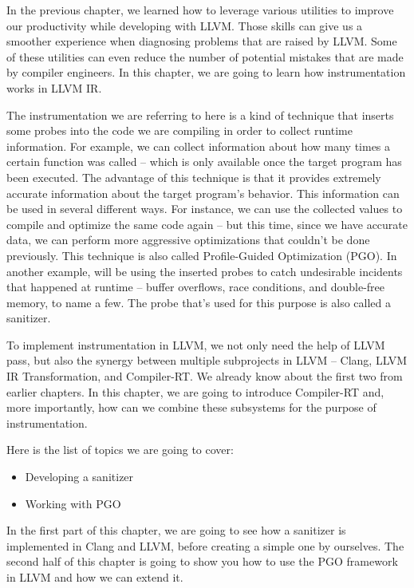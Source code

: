 In the previous chapter, we learned how to leverage various utilities to improve our productivity while developing with LLVM. Those skills can give us a smoother experience when diagnosing problems that are raised by LLVM. Some of these utilities can even reduce the number of potential mistakes that are made by compiler engineers. In this chapter, we are going to learn how instrumentation works in LLVM IR.

The instrumentation we are referring to here is a kind of technique that inserts some probes into the code we are compiling in order to collect runtime information. For example, we can collect information about how many times a certain function was called – which is only available once the target program has been executed. The advantage of this technique is that it provides extremely accurate information about the target program's behavior. This information can be used in several different ways. For instance, we can use the collected values to compile and optimize the same code again – but this time, since we have accurate data, we can perform more aggressive optimizations that couldn't be done previously. This technique is also called Profile-Guided Optimization (PGO). In another example, will be using the inserted probes to catch undesirable incidents that happened at runtime – buffer overflows, race conditions, and double-free memory, to name a few. The probe that's used for this purpose is also called a sanitizer.

To implement instrumentation in LLVM, we not only need the help of LLVM pass, but also the synergy between multiple subprojects in LLVM – Clang, LLVM IR Transformation, and Compiler-RT. We already know about the first two from earlier chapters. In this chapter, we are going to introduce Compiler-RT and, more importantly, how can we combine these subsystems for the purpose of instrumentation.

Here is the list of topics we are going to cover:

\begin{itemize}
\item Developing a sanitizer
\item Working with PGO
\end{itemize}


In the first part of this chapter, we are going to see how a sanitizer is implemented in Clang and LLVM, before creating a simple one by ourselves. The second half of this chapter is going to show you how to use the PGO framework in LLVM and how we can extend it.






